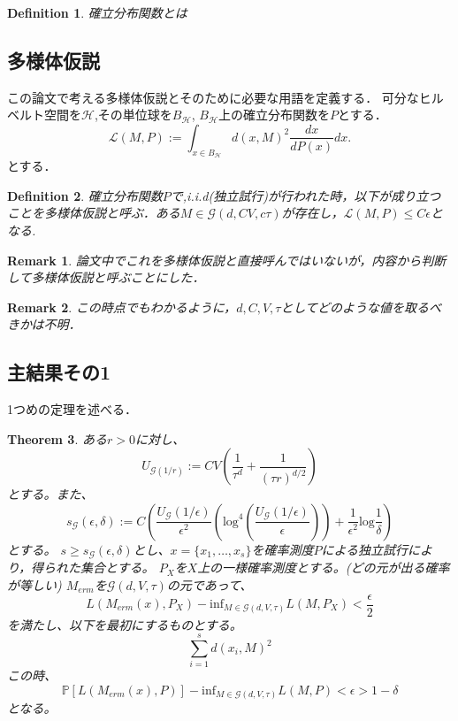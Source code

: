 \documentclass{ujarticle}
\newtheorem{thm}{Theorem}[section]
\newtheorem{dfn}[thm]{Definition}
\newtheorem*{rem}{Remark}
\begin{document}
\begin{dfn}
 確立分布関数とは
\end{dfn}

\subsection{多様体仮説}
\label{sub:多様体仮説}
この論文で考える多様体仮説とそのために必要な用語を定義する．
可分なヒルベルト空間を$\mathcal{H}$,その単位球を$B_{\mathcal{H}}$,
$B_{\mathcal{H}}$上の確立分布関数を$P$とする．
\begin{equation*}
 \mathcal{L}(M,P):=\int_{x \in B_{\mathcal{H}}} d(x,M)^2\frac{dx}{dP(x)}dx.
\end{equation*}
とする．
\begin{dfn}
  確立分布関数$P$で,i.i.d(独立試行)が行われた時，以下が成り立つことを多様体仮説と呼ぶ．ある$M \in \mathcal{G}(d,CV,c\tau)$が存在し，$\mathcal{L}(M,P) \le C \epsilon$となる.
\end{dfn}
\begin{rem}
 論文中でこれを多様体仮説と直接呼んではいないが，内容から判断して多様体仮説と呼ぶことにした．
\end{rem}
\begin{rem}
 この時点でもわかるように，$d,C,V,\tau$としてどのような値を取るべきかは不明．
\end{rem}

\subsection{主結果その1}
\label{sub:主結果その1}

1つめの定理を述べる．
\begin{thm}
 ある$r > 0$に対し、
 \begin{equation*}
  U_{\mathcal{G}(1/r)}:=CV( \frac{ 1 }{ \tau^d } + \frac{ 1 }{ (\tau r)^{d/2} } )
 \end{equation*}
 とする。また、
 \begin{equation*}
  s_{\mathcal{G}}(\epsilon,\delta):=C(\frac{ U_{\mathcal{G}}(1/\epsilon) }{ \epsilon^2 }(\mathrm{log}^4
  (\frac{U_{\mathcal{G}}(1/\epsilon)}{\epsilon})) + \frac{ 1 }{ \epsilon^2 }\mathrm{log}\frac{ 1 }{ \delta }  )
 \end{equation*}
とする。
$s \ge s_{\mathcal{G}}(\epsilon,\delta)$とし、$x=\{ x_1,\dots,x_s\}$を確率測度$P$による独立試行により，得られた集合とする。
$P_X$を$X$上の一様確率測度とする。(どの元が出る確率が等しい)
$M_{erm}$を$\mathcal{G}(d,V,\tau)$の元であって、
\begin{equation*}
 L(M_{erm}(x),P_X) - \mathrm{inf}_{M \in \mathcal{G}(d,V,\tau)} L(M,P_X) < \frac{ \epsilon }{ 2 }
\end{equation*}
を満たし、以下を最初にするものとする。
\begin{equation*}
 \sum_{i=1}^sd(x_i,M)^2
\end{equation*}
この時、
\begin{equation*}
 \mathbb{P}[L(M_{erm}(x),P)] - \mathrm{inf}_{M \in \mathcal{G}(d,V,\tau)} L(M,P) < \epsilon > 1- \delta
\end{equation*}
となる。
\end{thm}
\end{document}
